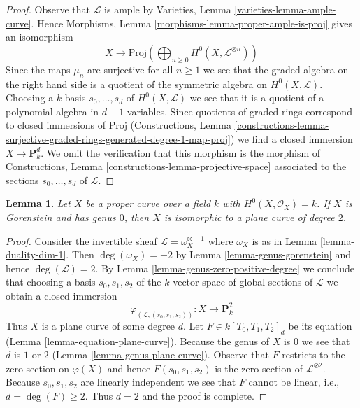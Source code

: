 \documentclass{stacks-project}
\theoremstyle{plain}
\newtheorem{lemma}[subsection]{Lemma}
\theoremstyle{definition}
\theoremstyle{remark}
\numberwithin{equation}{subsection}
\begin{document}
\begin{proof}
\medskip\noindent
Observe that $\mathcal{L}$ is ample by
Varieties, Lemma \ref{varieties-lemma-ample-curve}.
Hence
Morphisms, Lemma \ref{morphisms-lemma-proper-ample-is-proj}
gives an isomorphism
$$
X \longrightarrow
\text{Proj}\left(
\bigoplus\nolimits_{n \geq 0} H^0(X, \mathcal{L}^{\otimes n})\right)
$$
Since the maps $\mu_n$ are surjective for all $n \geq 1$ we see that
the graded algebra on the right hand side is a quotient of
the symmetric algebra on $H^0(X, \mathcal{L})$. Choosing a $k$-basis
$s_0, \ldots, s_d$ of $H^0(X, \mathcal{L})$ we see that
it is a quotient of a polynomial algebra in $d + 1$ variables.
Since quotients of graded rings correspond to closed immersions
of $\text{Proj}$ (Constructions, Lemma
\ref{constructions-lemma-surjective-graded-rings-generated-degree-1-map-proj})
we find a closed immersion $X \to \mathbf{P}^d_k$. We omit the
verification that this morphism is the morphism of
Constructions, Lemma \ref{constructions-lemma-projective-space}
associated to the sections $s_0, \ldots, s_d$ of $\mathcal{L}$.
\end{proof}

\begin{lemma}
\label{lemma-genus-zero}
Let $X$ be a proper curve over a field $k$ with $H^0(X, \mathcal{O}_X) = k$.
If $X$ is Gorenstein and has genus $0$, then $X$
is isomorphic to a plane curve of degree $2$.
\end{lemma}

\begin{proof}
Consider the invertible sheaf $\mathcal{L} = \omega_X^{\otimes -1}$ where
$\omega_X$ is as in Lemma \ref{lemma-duality-dim-1}. Then
$\deg(\omega_X) = -2$ by Lemma \ref{lemma-genus-gorenstein}
and hence $\deg(\mathcal{L}) = 2$. By
Lemma \ref{lemma-genus-zero-positive-degree}
we conclude that choosing a basis $s_0, s_1, s_2$ of the $k$-vector
space of global sections of $\mathcal{L}$ we obtain a closed immersion
$$
\varphi_{(\mathcal{L}, (s_0, s_1, s_2))} :
X \longrightarrow \mathbf{P}^2_k
$$
Thus $X$ is a plane curve of some degree $d$. Let $F \in k[T_0, T_1, T_2]_d$
be its equation (Lemma \ref{lemma-equation-plane-curve}).
Because the genus of $X$ is $0$ we see that $d$ is $1$ or $2$
(Lemma \ref{lemma-genus-plane-curve}). Observe that
$F$ restricts to the zero section on $\varphi(X)$ and hence
$F(s_0, s_1, s_2)$ is the zero section of $\mathcal{L}^{\otimes 2}$.
Because $s_0, s_1, s_2$ are linearly independent we see that $F$
cannot be linear, i.e., $d = \deg(F) \geq 2$. Thus $d = 2$
and the proof is complete.
\end{proof}
\end{document}
